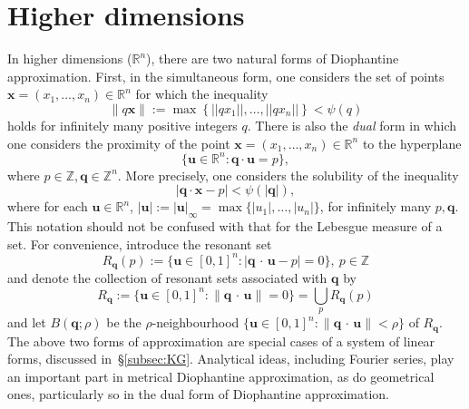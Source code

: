 \documentclass[reqno]{amsart}
\newcommand{\R}{{\mathbb{R}}}
\newcommand{\Z}{{\mathbb{Z}}}
\newcommand{\0}{{\mathbf{0}}}
\newcommand{\q}{{\mathbf{q}}}
\newcommand{\DA}{Diophantine approximation}
\newcommand{\ub}{\mathbf{u}}
\newcommand{\xb}{\mathbf{x}}
\newcommand{\ip}{\,{\cdot}\,}
\newcommand{\im}{infinitely many}
\def\Bqbr{B(\q;\rho)}
\begin{document}
\section{Higher dimensions}
In higher dimensions ($\R^n$), there are two natural forms of
Diophantine approximation. First, in the simultaneous form, one
considers the set of points $\xb =(x_1,\dots,x_n)\in \R^n$ for which
the inequality 
\begin{equation}
\label{eq:qxb}
\|q\xb\|:=\max\left\{||qx_1||,\dots,||qx_n|| \right\} < \psi(q)  
\end{equation}
holds for infinitely many positive integers $q$. There is also the {\it dual}
form in which one considers the proximity of the point
$\xb=(x_1,\dots,x_n)\in\R^n$ to the hyperplane 
\begin{equation}
  \label{eq:Rpq}
\{\ub\in\R^n\colon \q\cdot\ub=p\},
\end{equation}
where $p\in\Z, \q\in\Z^n$. More precisely, one considers the
solubility of the inequality
\begin{equation}
  \label{eq:2}
|\q\cdot \xb-p|<\psi(|\q|),
\end{equation}
where for each $\ub\in\R^n$, $|\ub|:=|\ub|_\infty =
\max\{|u_1|,\dots,|u_n|\}$, for \im{} $p, \q$.  This notation should
not be confused with that for the Lebesgue measure of a set. For
convenience, introduce the resonant set
\begin{equation}
\label{eq:Rqp}
   R_{\q}(p):=\{\ub\in [0,1]^n\colon |\q\ip \ub-p| = 0\}, \ p\in \Z
\end{equation} 
and denote the collection of resonant sets associated with $\q$ by
\begin{equation}
\label{eq:Rq}
  R_{\q}:=\{\ub\in [0,1]^n\colon \|\q\ip \ub\| = 0\} 
=\bigcup_{p} R_{\q}(p)
\end{equation} 
and let $\Bqbr$ be the $\rho$-neighbourhood 
$\{\ub\in [0,1]^n\colon \|\q\ip \ub\| < \rho\}$ of $R_\q$.
The above two forms of approximation are special cases of a system of
linear forms, discussed in~\S\ref{subsec:KG}.  Analytical ideas,
including Fourier series, play an important part in metrical
Diophantine approximation, as do geometrical ones, particularly so in
the dual form of \DA.
\end{document}

